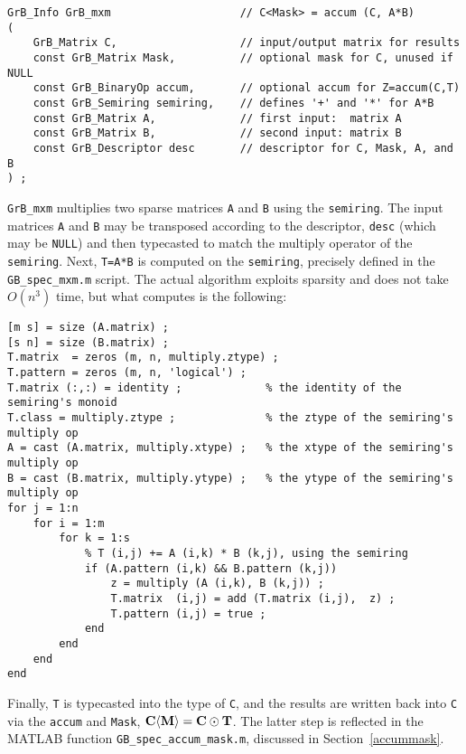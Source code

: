 \documentclass[12pt]{article}
\begin{document}
\begin{mdframed}[userdefinedwidth=6in]
{\footnotesize
\begin{verbatim}
GrB_Info GrB_mxm                    // C<Mask> = accum (C, A*B)
(
    GrB_Matrix C,                   // input/output matrix for results
    const GrB_Matrix Mask,          // optional mask for C, unused if NULL
    const GrB_BinaryOp accum,       // optional accum for Z=accum(C,T)
    const GrB_Semiring semiring,    // defines '+' and '*' for A*B
    const GrB_Matrix A,             // first input:  matrix A
    const GrB_Matrix B,             // second input: matrix B
    const GrB_Descriptor desc       // descriptor for C, Mask, A, and B
) ;
\end{verbatim} } \end{mdframed}

\verb'GrB_mxm' multiplies two sparse matrices \verb'A' and \verb'B' using the
\verb'semiring'.  The input matrices \verb'A' and \verb'B' may be transposed
according to the descriptor, \verb'desc' (which may be \verb'NULL') and then
typecasted to match the multiply operator of the \verb'semiring'.  Next,
\verb'T=A*B' is computed on the \verb'semiring', precisely defined in the
\verb'GB_spec_mxm.m' script.  The actual algorithm exploits sparsity and does
not take $O(n^3)$ time, but what computes is the following:

{\footnotesize
\begin{verbatim}
[m s] = size (A.matrix) ;
[s n] = size (B.matrix) ;
T.matrix  = zeros (m, n, multiply.ztype) ;
T.pattern = zeros (m, n, 'logical') ;
T.matrix (:,:) = identity ;             % the identity of the semiring's monoid
T.class = multiply.ztype ;              % the ztype of the semiring's multiply op
A = cast (A.matrix, multiply.xtype) ;   % the xtype of the semiring's multiply op
B = cast (B.matrix, multiply.ytype) ;   % the ytype of the semiring's multiply op
for j = 1:n
    for i = 1:m
        for k = 1:s
            % T (i,j) += A (i,k) * B (k,j), using the semiring
            if (A.pattern (i,k) && B.pattern (k,j))
                z = multiply (A (i,k), B (k,j)) ;
                T.matrix  (i,j) = add (T.matrix (i,j),  z) ;
                T.pattern (i,j) = true ;
            end
        end
    end
end \end{verbatim}}

Finally, \verb'T' is typecasted into the type of \verb'C', and the results are
written back into \verb'C' via the \verb'accum' and \verb'Mask', ${\bf C
\langle M \rangle  = C \odot T}$.  The latter step is reflected in the MATLAB
function \verb'GB_spec_accum_mask.m', discussed in Section~\ref{accummask}.
\end{document}
